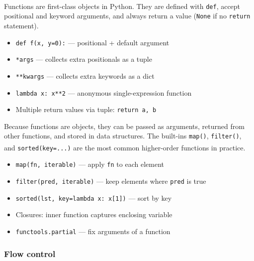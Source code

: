 \begin{tcbitemize}[ skin=sectionraster ]
    \tcbitem[title={Defining Functions}, raster multicolumn=3]
    Functions are first-class objects in Python\textsuperscript{\cite{romanoLearnPythonProgramming2021}}.
    They are defined with \texttt{def}, accept positional and keyword arguments, and always return a value (\texttt{None} if no \texttt{return} statement).
    \tcblower
    \begin{itemize}
        \item \texttt{def f(x, y=0):} --- positional + default argument
        \item \texttt{*args} --- collects extra positionals as a tuple
        \item \texttt{**kwargs} --- collects extra keywords as a dict
        \item \texttt{lambda x: x**2} --- anonymous single-expression function
        \item Multiple return values via tuple: \texttt{return a, b}
    \end{itemize}

    \tcbitem[title={Higher-Order Functions}, raster multicolumn=3]
    Because functions are objects, they can be passed as arguments, returned from other functions, and stored in data structures.
    The built-ins \texttt{map()}, \texttt{filter()}, and \texttt{sorted(key=...)} are the most common higher-order functions in practice\textsuperscript{\cite{romanoLearnPythonProgramming2021}}.
    \tcblower
    \begin{itemize}
        \item \texttt{map(fn, iterable)} --- apply \texttt{fn} to each element
        \item \texttt{filter(pred, iterable)} --- keep elements where \texttt{pred} is true
        \item \texttt{sorted(lst, key=lambda x: x[1])} --- sort by key
        \item Closures: inner function captures enclosing variable
        \item \texttt{functools.partial} --- fix arguments of a function
    \end{itemize}
\end{tcbitemize}

\subsubsection{Flow control}

